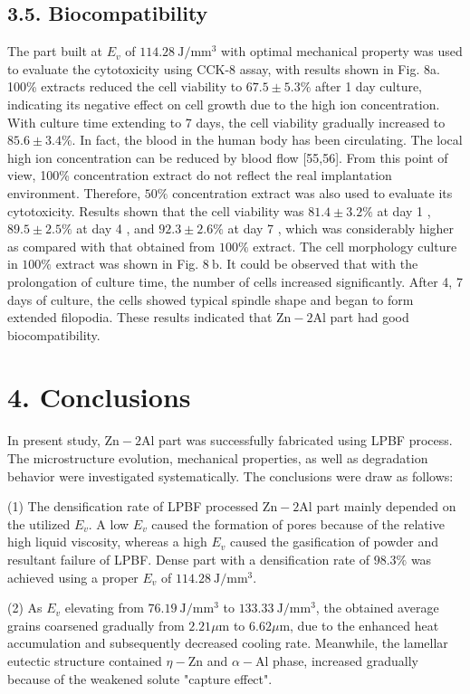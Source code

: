 \documentclass[10pt]{article}
\begin{document}
\subsection*{3.5. Biocompatibility}
The part built at $E_{v}$ of $114.28 \mathrm{~J} / \mathrm{mm}^{3}$ with optimal mechanical property was used to evaluate the cytotoxicity using CCK-8 assay, with results shown in Fig. 8a. 100\% extracts reduced the cell viability to $67.5 \pm 5.3 \%$ after 1 day culture, indicating its negative effect on cell growth due to the high ion concentration. With culture time extending to 7 days, the cell viability gradually increased to $85.6 \pm 3.4 \%$. In fact, the blood in the human body has been circulating. The local high ion concentration can be reduced by blood flow [55,56]. From this point of view, 100\% concentration extract do not reflect the real implantation environment. Therefore, $50 \%$ concentration extract was also used to evaluate its cytotoxicity. Results shown that the cell viability was $81.4 \pm 3.2 \%$ at day 1 , $89.5 \pm 2.5 \%$ at day 4 , and $92.3 \pm 2.6 \%$ at day 7 , which was considerably higher as compared with that obtained from $100 \%$ extract. The cell morphology culture in $100 \%$ extract was shown in Fig. $8 \mathrm{~b}$. It could be observed that with the prolongation of culture time, the number of cells increased significantly. After 4, 7 days of culture, the cells showed typical spindle shape and began to form extended filopodia. These results indicated that $\mathrm{Zn}-2 \mathrm{Al}$ part had good biocompatibility.

\section*{4. Conclusions}
In present study, $\mathrm{Zn}-2 \mathrm{Al}$ part was successfully fabricated using LPBF process. The microstructure evolution, mechanical properties, as well as degradation behavior were investigated systematically. The conclusions were draw as follows:

(1) The densification rate of LPBF processed $\mathrm{Zn}-2 \mathrm{Al}$ part mainly depended on the utilized $E_{v}$. A low $E_{v}$ caused the formation of pores because of the relative high liquid viscosity, whereas a high $E_{v}$ caused the gasification of powder and resultant failure of LPBF. Dense part with a densification rate of $98.3 \%$ was achieved using a proper $E_{v}$ of $114.28 \mathrm{~J} / \mathrm{mm}^{3}$.

(2) As $E_{v}$ elevating from $76.19 \mathrm{~J} / \mathrm{mm}^{3}$ to $133.33 \mathrm{~J} / \mathrm{mm}^{3}$, the obtained average grains coarsened gradually from $2.21 \mu \mathrm{m}$ to $6.62 \mu \mathrm{m}$, due to the enhanced heat accumulation and subsequently decreased cooling rate. Meanwhile, the lamellar eutectic structure contained $\eta-\mathrm{Zn}$ and $\alpha-\mathrm{Al}$ phase, increased gradually because of the weakened solute "capture effect".
\end{document}
